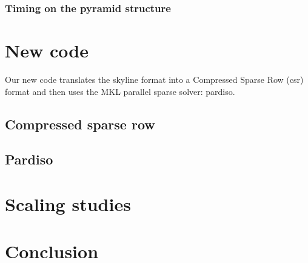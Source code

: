\documentclass[11pt]{article}
\begin{document}
\subsubsection{Timing on the pyramid structure}

\section{New code}
Our new code translates the skyline format into a Compressed Sparse Row (csr) format and then uses the MKL parallel sparse solver: pardiso.

\subsection{Compressed sparse row}

\subsection{Pardiso}


\section{Scaling studies}

\section{Conclusion}
\end{document}
